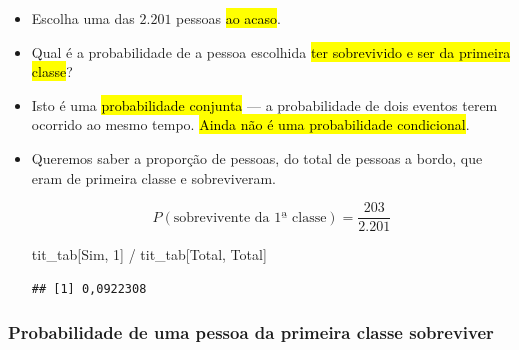\documentclass[
  11pt]{report}
\newenvironment{Shaded}{\begin{snugshade}}{\end{snugshade}}
\newcommand{\NormalTok}[1]{#1}
\newcommand{\SpecialCharTok}[1]{\textcolor[rgb]{0.00,0.00,0.00}{#1}}
\newcommand{\StringTok}[1]{\textcolor[rgb]{0.31,0.60,0.02}{#1}}
\renewenvironment{Shaded}{
    \begin{mdframed}[%
      roundcorner=2pt,%
      innerleftmargin=5pt,%
      innerrightmargin=5pt,%
      topline=true,%
      leftline=true,%
      rightline=true,%
      bottomline=true,%
      linewidth=0.5pt,%
      linecolor=black!20,%
      backgroundcolor=black!2,%
      skipabove=2ex,%
      skipbelow=2.5ex%
    ]%
  }
  {
    \end{mdframed}
  }
\begin{document}
\begin{itemize}
\item
  Escolha uma das $2.201$ pessoas {\hl{ao acaso}}.
\item
  Qual é a probabilidade de a pessoa escolhida {\hl{ter sobrevivido e ser da primeira classe}}?
\item
  Isto é uma {\hl{probabilidade conjunta}} --- a probabilidade de dois eventos terem ocorrido ao mesmo tempo. {\hl{Ainda não é uma probabilidade condicional}}.
\item
  Queremos saber a proporção de pessoas, do total de pessoas a bordo, que eram de primeira classe e sobreviveram.

  \[
  P(\text{sobrevivente da 1ª classe}) = 
  \frac
  {203}
  {2.201}
  \]

\begin{Shaded}
\begin{Highlighting}[]
\NormalTok{tit\_tab[}\StringTok{\textquotesingle{}Sim\textquotesingle{}}\NormalTok{, }\StringTok{\textquotesingle{}1\textquotesingle{}}\NormalTok{] }\SpecialCharTok{/}\NormalTok{ tit\_tab[}\StringTok{\textquotesingle{}Total\textquotesingle{}}\NormalTok{, }\StringTok{\textquotesingle{}Total\textquotesingle{}}\NormalTok{]}
\end{Highlighting}
\end{Shaded}

\begin{verbatim}
## [1] 0,0922308
\end{verbatim}
\end{itemize}

\hypertarget{probabilidade-de-uma-pessoa-da-primeira-classe-sobreviver}{%
\subsubsection*{Probabilidade de uma pessoa da primeira classe sobreviver}\label{probabilidade-de-uma-pessoa-da-primeira-classe-sobreviver}}
\end{document}
